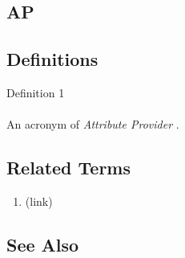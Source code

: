 \newpage \subsection*{AP } \subsection*{Definitions } \begin{DIC_Def}{Definition 1 }{} \paragraph{} An acronym of  \emph{ Attribute Provider  } .  \end{DIC_Def} \subsection*{Related Terms } \begin{enumerate} \item  (link) \href{Attribute Provider (Dictionary Entry) }{ }   \end{enumerate} \subsection*{See Also } 